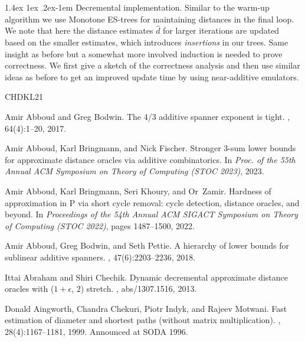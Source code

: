 \documentclass[11pt]{article}
\makeatletter
\theoremstyle{definition}
\theoremstyle{remark}
\renewcommand{\paragraph}{%
  \@startsection{paragraph}{4}%
  {\z@}{1.4ex \@plus 1ex \@minus .2ex}{-1em}%
  {\normalfont\normalsize\bfseries}%
}
\makeatother
\begin{document}
\begin{titlepage}
{\paragraph{Decremental implementation.} Similar to the warm-up algorithm we use Monotone ES-trees for maintaining distances in the final loop. We note that here the distance estimates $\hat{d}$ for larger iterations are updated based on the smaller estimates, which introduces \textit{insertions} in our trees. Same insight as before but a somewhat more involved induction is needed to prove correctness. We first give a sketch of the correctness analysis and then use similar ideas as before to get an improved update time by using near-additive emulators.
}




\newcommand{\etalchar}[1]{$^{#1}$}
\begin{thebibliography}{CHDKL21}

Amir Abboud and Greg Bodwin.
\newblock The 4/3 additive spanner exponent is tight.
, 64(4):1--20, 2017.

Amir Abboud, Karl Bringmann, and Nick Fischer.
\newblock Stronger 3-sum lower bounds for approximate distance oracles via
  additive combinatorics.
\newblock In {\em Proc. of the 55th Annual ACM Symposium on Theory of Computing
  ({STOC} 2023)}, 2023.

Amir Abboud, Karl Bringmann, Seri Khoury, and Or~Zamir.
\newblock Hardness of approximation in {P} via short cycle removal: cycle
  detection, distance oracles, and beyond.
\newblock In {\em Proceedings of the 54th Annual {ACM} {SIGACT} Symposium on
  Theory of Computing ({STOC} 2022)}, pages 1487--1500, 2022.

Amir Abboud, Greg Bodwin, and Seth Pettie.
\newblock A hierarchy of lower bounds for sublinear additive spanners.
, 47(6):2203--2236, 2018.

Ittai Abraham and Shiri Chechik.
\newblock Dynamic decremental approximate distance oracles with ($1+\epsilon$,
  $2$) stretch.
, abs/1307.1516, 2013.

Donald Aingworth, Chandra Chekuri, Piotr Indyk, and Rajeev Motwani.
\newblock Fast estimation of diameter and shortest paths (without matrix
  multiplication).
, 28(4):1167--1181, 1999.
\newblock Announced at {SODA} 1996.


\end{thebibliography}
\end{titlepage}
\end{document}
